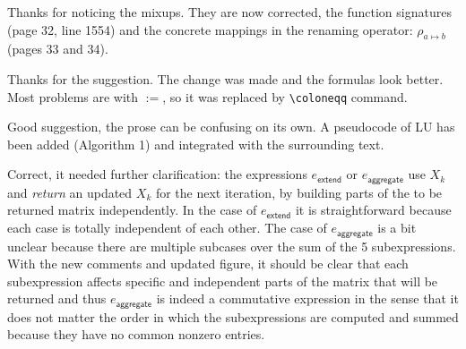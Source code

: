 \answer Thanks for noticing the mixups. They are now corrected, the function signatures (page 32, line 1554) and the concrete mappings in the renaming operator: $\rho_{a\mapsto b}$ (pages 33 and 34).

\bigskip

\begin{comment}
	And you should use \verb+\colon+ instead of $:$, because $:$ is treated as
	a division operator by Latex and thus the spacing is not correct.
\end{comment}

\answer Thanks for the suggestion. The change was made and the formulas look better.
Most problems are with $:=$, so it was replaced by \verb|\coloneqq| command.
\bigskip

\begin{comment}
	LU-Decomposition: You should definitely provide some pseudocode for the LU Decomposition
	algorithm in order to allow a simpler comparison with your MATLANG
	expressions. Right now the algorithm is given as prose. Furthermore it is not
	even complete as the definition of $c_i$ with $i \neq 1$ is missing.
\end{comment}

\answer Good suggestion, the prose can be confusing on its own. A pseudocode of LU has been added (Algorithm 1) and integrated with the surrounding text.
\bigskip

\begin{comment}
	Algorithm 1: the aggregate function is working in a completely different way than your
	MATLANG construction. The MATLANG constructions is a sum over 5 expressions,
	which especially implies that the order of evaluation is irrelevant. However
	the algorithm is written in a way that the order of the statements is very
	important. Especially it is not the case that the five expressions correspond
	to five different cases of the algorithm as you claim.
	(\ldots)
	some constructions are way more complex than needed.
\end{comment}

\answer Correct, it needed further clarification: the expressions $e_{\mathsf{extend}}$ or $e_{\mathsf{aggregate}}$ use $X_k$ and \emph{return} an updated $X_k$ for the next iteration, by building parts of the to be returned matrix independently.
In the case of $e_{\mathsf{extend}}$ it is straightforward because each case is totally independent of each other.
The case of $e_{\mathsf{aggregate}}$ is a bit unclear because there are multiple subcases over the sum of the 5 subexpressions.
With the new comments and updated figure, it should be clear that each subexpression affects specific and independent parts of the matrix that will be returned and thus $e_{\mathsf{aggregate}}$ is indeed a commutative expression in the sense that it does not matter the order in which the subexpressions are computed and summed because they have no common nonzero entries.

